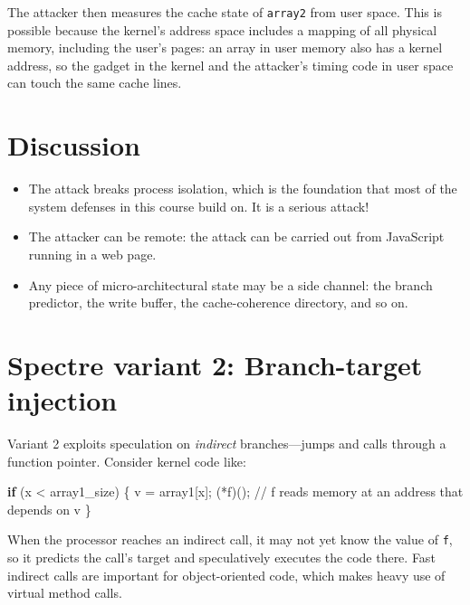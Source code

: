 \documentclass[
  letterpaper,
]{scrbook}
\newenvironment{Shaded}{\begin{snugshade}}{\end{snugshade}}
\newcommand{\CommentTok}[1]{\textcolor[rgb]{0.37,0.37,0.37}{#1}}
\newcommand{\ControlFlowTok}[1]{\textcolor[rgb]{0.00,0.23,0.31}{\textbf{#1}}}
\newcommand{\NormalTok}[1]{\textcolor[rgb]{0.00,0.23,0.31}{#1}}
\newcommand{\OperatorTok}[1]{\textcolor[rgb]{0.37,0.37,0.37}{#1}}
\theoremstyle{definition}
\theoremstyle{plain}
\theoremstyle{plain}
\theoremstyle{remark}
\begin{document}
The attacker then measures the cache state of \texttt{array2} from user
space. This is possible because the kernel's address space includes a
mapping of all physical memory, including the user's pages: an array in
user memory also has a kernel address, so the gadget in the kernel and
the attacker's timing code in user space can touch the same cache lines.

\section{Discussion}\label{discussion}

\begin{itemize}
\item
  The attack breaks process isolation, which is the foundation that most
  of the system defenses in this course build on. It is a serious
  attack!
\item
  The attacker can be remote: the attack can be carried out from
  JavaScript running in a web page.
\item
  Any piece of micro-architectural state may be a side channel: the
  branch predictor, the write buffer, the cache-coherence directory, and
  so on.
\end{itemize}

\section{Spectre variant 2: Branch-target
injection}\label{spectre-variant-2-branch-target-injection}

Variant 2 exploits speculation on \emph{indirect} branches---jumps and
calls through a function pointer. Consider kernel code like:

\begin{Shaded}
\begin{Highlighting}[]
\ControlFlowTok{if} \OperatorTok{(}\NormalTok{x }\OperatorTok{\textless{}}\NormalTok{ array1\_size}\OperatorTok{)} \OperatorTok{\{}
\NormalTok{    v }\OperatorTok{=}\NormalTok{ array1}\OperatorTok{[}\NormalTok{x}\OperatorTok{];}
    \OperatorTok{(*}\NormalTok{f}\OperatorTok{)();}   \CommentTok{// f reads memory at an address that depends on v}
\OperatorTok{\}}
\end{Highlighting}
\end{Shaded}

When the processor reaches an indirect call, it may not yet know the
value of \texttt{f}, so it predicts the call's target and speculatively
executes the code there. Fast indirect calls are important for
object-oriented code, which makes heavy use of virtual method calls.
\end{document}
